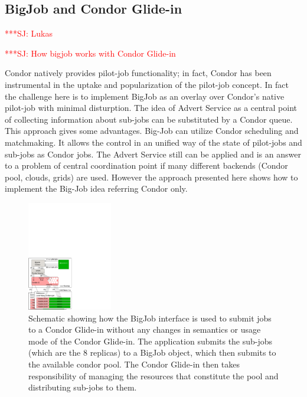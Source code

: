 \documentclass[conference,final]{IEEEtran}
\newcommand{\jhanote}[1]{ {\textcolor{red} { ***SJ: #1 }}}
\newcommand{\jhanote}[1]{}
\begin{document}
\subsection{BigJob and Condor Glide-in} \jhanote{Lukas}


\jhanote{How bigjob works with Condor Glide-in}

Condor natively provides pilot-job functionality; in fact, Condor has
been instrumental in the uptake and popularization of the pilot-job
concept.
In fact the challenge here is to implement BigJob as an overlay over
Condor's native pilot-job with minimal disturption. The idea of Advert
Service as a central point of collecting information about sub-jobs
can be substituted by a Condor queue. This approach gives some
advantages.  Big-Job can utilize Condor scheduling and matchmaking. It
allows the control in an unified way of the state of pilot-jobs and
sub-jobs as Condor jobs. The Advert Service still can be applied and
is an answer to a problem of central coordination point if many
different backends (Condor pool, clouds, grids) are used.  However the
approach presented here shows how to implement the Big-Job idea
referring Condor only.

\begin{figure}[!ht]
 \begin{center}
     \includegraphics[width=0.33\textwidth]{figures/bigjob_condor}
 \end{center}
 \caption{\small Schematic showing how the BigJob interface is used to
   submit jobs to a Condor Glide-in without any changes in semantics
   or usage mode of the Condor Glide-in. The application submits the
   sub-jobs (which are the 8 replicas) to a BigJob object, which then
   submits to the available condor pool. The Condor Glide-in then
   takes responsibility of managing the resources that constitute the
   pool and distributing sub-jobs to them.} \label{fig:saga-condor}
\end{figure}
\end{document}
